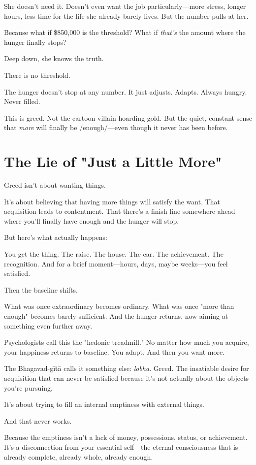 \documentclass[11pt,twoside]{book}
\begin{document}
She doesn't need it. Doesn't even want the job particularly—more stress, longer hours, less time for the life she already barely lives. But the number pulls at her.

Because what if \$850,000 is the threshold? What if \emph{that's} the amount where the hunger finally stops?

Deep down, she knows the truth.

There is no threshold.

The hunger doesn't stop at any number. It just adjusts. Adapts. Always hungry. Never filled.

This is greed. Not the cartoon villain hoarding gold. But the quiet, constant sense that \emph{more} will finally be /enough/—even though it never has been before.

\section*{The Lie of "Just a Little More"}

Greed isn't about wanting things.

It's about believing that having more things will satisfy the want. That acquisition leads to contentment. That there's a finish line somewhere ahead where you'll finally have enough and the hunger will stop.

But here's what actually happens:

You get the thing. The raise. The house. The car. The achievement. The recognition. And for a brief moment—hours, days, maybe weeks—you feel satisfied.

Then the baseline shifts.

What was once extraordinary becomes ordinary. What was once "more than enough" becomes barely sufficient. And the hunger returns, now aiming at something even further away.

Psychologists call this the "hedonic treadmill." No matter how much you acquire, your happiness returns to baseline. You adapt. And then you want more.

The Bhagavad-gītā calls it something else: \emph{lobha}. Greed. The insatiable desire for acquisition that can never be satisfied because it's not actually about the objects you're pursuing.

It's about trying to fill an internal emptiness with external things.

And that never works.

Because the emptiness isn't a lack of money, possessions, status, or achievement. It's a disconnection from your essential self—the eternal consciousness that is already complete, already whole, already enough.
\end{document}
